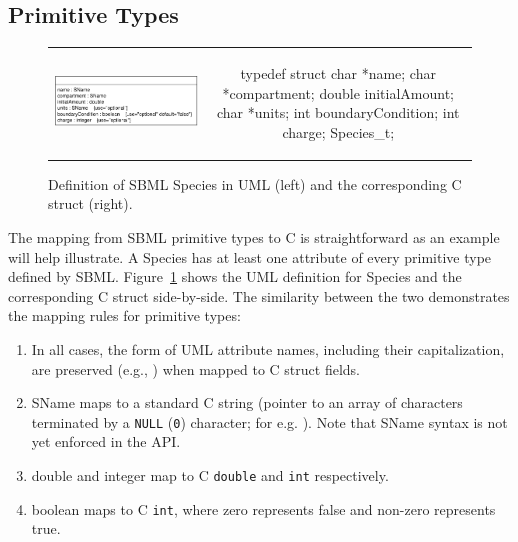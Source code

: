 \documentclass{sbmlmanual}
\begin{document}
\subsection{Primitive Types}


\begin{figure}[t]
  \begin{tabular}{m{8.5cm}c}
    \includegraphics[scale=0.68]{species}
    &
    \begin{example}[c]
typedef struct
{
  char    *name;
  char    *compartment;
  double  initialAmount;
  char    *units;
  int     boundaryCondition;
  int     charge;
} Species_t;
    \end{example}\\
  \end{tabular}
  \caption{Definition of SBML Species in UML (left) and the
  corresponding  C struct (right).}
  \label{fig:species-uml-and-c}
\end{figure}

The mapping from SBML primitive types to C is straightforward as an
example will help illustrate.  A Species has at least one attribute of
every primitive type defined by SBML.
Figure~\ref{fig:species-uml-and-c} shows the UML definition for
Species and the corresponding C struct side-by-side.  The similarity
between the two demonstrates the mapping rules for primitive types:

\begin{enumerate}
  
  \item In all cases, the form of UML attribute names, including their
  capitalization, are preserved (e.g., ) when
  mapped to C struct fields.

  \item SName maps to a standard C string (pointer to an array of
  characters terminated by a \texttt{NULL} (\texttt{0}) character; for
  e.g. ).  Note that SName syntax is not yet
  enforced in the API.

  \item double and integer map to C \texttt{double} and \texttt{int}
  respectively.

  \item boolean maps to C \texttt{int}, where zero represents false
  and non-zero represents true.

\end{enumerate}
\end{document}
